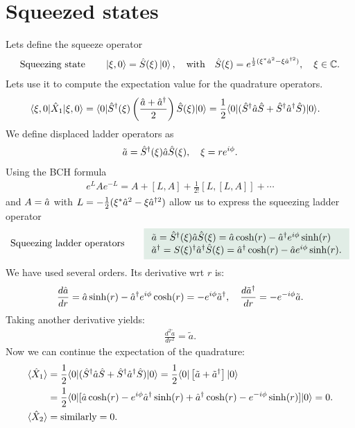 \section{Squeezed states}
Lets define the squeeze operator 
\begin{align*}
    \text{Squeezing state}\qquad\left|\xi,0\right\rangle=\hat{S}(\xi)\left|0\right\rangle,\quad\text{with}\quad\hat{S}(\xi)=e^{\frac{1}{2}(\xi^*\hat{a}^2-\xi\hat{a}^{\dagger2})},\quad\xi\in\mathbb{C}.
\end{align*}
Lets use it to compute the expectation value for the quadrature operators.
\begin{align*}
    \langle\xi,0|\hat{X}_1|\xi,0\rangle&=\langle0|\hat{S}^\dagger(\xi)\left(\frac{\hat{a}+\hat{a}^\dagger}{2}\right)\hat{S}(\xi)|0\rangle=\frac{1}{2}\langle0|(\hat{S}^\dagger\hat{a}\hat{S}+\hat{S}^\dagger\hat{a}^\dagger\hat{S})|0\rangle.
\end{align*}
We define displaced ladder operators as
\begin{align*}
    \tilde{a}=\hat{S}^\dagger(\xi)\hat{a}\hat{S}(\xi),\quad\xi=re^{i\phi}.
\end{align*}
Using the BCH formula 
\begin{align*}
    e^LAe^{-L}=A+[L,A]+\frac{1}{2!}[L,[L,A]]+\cdots
\end{align*}
and $A=\hat{a}$ with $L=-\frac{1}{2}(\xi^*\hat{a}^2-\xi\hat{a}^{\dagger2})$ allow us to express the squeezing ladder operator 
\begin{align}
    \text{Squeezing ladder operators}\qquad
    \highlight{
    \begin{array}{l}
        \tilde{a}=\hS^\dagger(\xi)\ha\hS(\xi)=\ha\cosh(r)-\ha^\dagger e^{i\phi}\sinh(r)\\
        \tilde{a}^\dagger=S(\xi)^\dagger\ha^\dagger\hS(\xi)=\ha^\dagger\cosh(r)-\ha e^{i\phi}\sinh(r).
    \end{array}}
\end{align}
We have used several orders. Its derivative wrt $r$ is:
\begin{align*}
    \frac{d\hat{a}}{dr}=\hat{a}\sinh(r)-\hat{a}^\dagger e^{i\phi}\cosh(r)=-e^{i\phi}\tilde{a}^\dagger,\quad\frac{d\tilde{a}^\dagger}{dr}=-e^{-i\phi}\tilde{a}.
\end{align*} 
Taking another derivative yields:
\begin{align*}
    \frac{d^2\tilde{a}}{dr^2}=\tilde{a}.
\end{align*}
Now we can continue the expectation of the quadrature:
\begin{align*}
    \langle\hat{X}_1\rangle&=\frac{1}{2}\langle0|(\hat{S}^\dagger\hat{a}\hat{S}+\hat{S}^\dagger\hat{a}^\dagger\hat{S})|0\rangle=\frac{1}{2}\langle0|\left[\tilde{a}+\tilde{a}^\dagger\right]|0\rangle\\
    &=\frac{1}{2}\langle0|[\hat{a}\cosh(r)-e^{i\phi}\hat{a}^\dagger\sinh(r)+\hat{a}^\dagger\cosh(r)-e^{-i\phi}\sinh(r)]|0\rangle=0.\\
    \langle\hat{X}_2\rangle&=\text{similarly}=0.
\end{align*}
